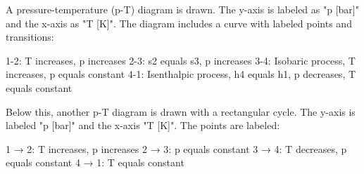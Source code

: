 A pressure-temperature (p-T) diagram is drawn. The y-axis is labeled as "p [bar]" and the x-axis as "T [K]". The diagram includes a curve with labeled points and transitions:  

1-2: T increases, p increases  
2-3: s2 equals s3, p increases  
3-4: Isobaric process, T increases, p equals constant  
4-1: Isenthalpic process, h4 equals h1, p decreases, T equals constant  

Below this, another p-T diagram is drawn with a rectangular cycle. The y-axis is labeled "p [bar]" and the x-axis "T [K]". The points are labeled:  

1 → 2: T increases, p increases  
2 → 3: p equals constant  
3 → 4: T decreases, p equals constant  
4 → 1: T equals constant